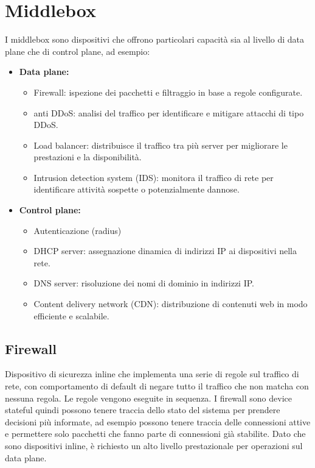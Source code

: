 \section{Middlebox}
I middlebox sono dispositivi che offrono particolari capacità sia al livello di data plane che di control plane, ad esempio:
\begin{itemize}
	\item \textbf{Data plane:}
	\begin{itemize}
		\item Firewall: ispezione dei pacchetti e filtraggio in base a regole configurate.
		\item anti DDoS: analisi del traffico per identificare e mitigare attacchi di tipo DDoS.
		\item Load balancer: distribuisce il traffico tra più server per migliorare le prestazioni e la disponibilità.
		\item Intrusion detection system (IDS): monitora il traffico di rete per identificare attività sospette o potenzialmente dannose.
	\end{itemize}
	\item \textbf{Control plane:}
	\begin{itemize}
		\item Autenticazione (radius)
		\item DHCP server: assegnazione dinamica di indirizzi IP ai dispositivi nella rete.
		\item DNS server: risoluzione dei nomi di dominio in indirizzi IP.
		\item Content delivery network (CDN): distribuzione di contenuti web in modo efficiente e scalabile.
	\end{itemize}
\end{itemize}
\subsection{Firewall}
Dispositivo di sicurezza inline che implementa una serie di regole sul traffico di rete, con comportamento di default di negare tutto il traffico che non matcha con nessuna regola.
Le regole vengono eseguite in sequenza.
I firewall sono device stateful quindi possono tenere traccia dello stato del sistema per prendere decisioni più informate, ad esempio possono tenere traccia delle connessioni attive e permettere solo pacchetti che fanno parte di connessioni già stabilite.
Dato che sono dispositivi inline, è richiesto un alto livello prestazionale per operazioni sul data plane.

